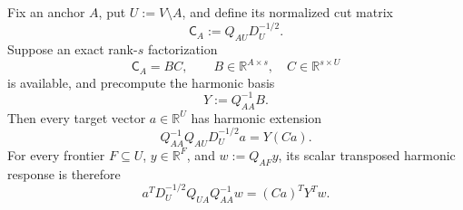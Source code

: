 \begin{theorem}
\label{thm:low-cut-rank-harmonic-bank}
Fix an anchor $A$, put $U:=V\setminus A$, and define its normalized cut
matrix
\begin{equation}
 \mathsf C_A:=Q_{AU}D_U^{-1/2}.
 \label{eq:normalized-anchor-cut}
\end{equation}
Suppose an exact rank-$s$ factorization
\begin{equation}
 \mathsf C_A=BC,
 \qquad
 B\in\mathbb R^{A\times s},
 \quad
 C\in\mathbb R^{s\times U}
 \label{eq:cut-rank-factorization}
\end{equation}
is available, and precompute the harmonic basis
\begin{equation}
 Y:=Q_{AA}^{-1}B.
 \label{eq:cut-rank-harmonic-basis}
\end{equation}
Then every target vector $a\in\mathbb R^U$ has harmonic extension
\begin{equation}
 Q_{AA}^{-1}Q_{AU}D_U^{-1/2}a=Y(Ca).
 \label{eq:cut-rank-target-extension}
\end{equation}
For every frontier $F\subseteq U$, $y\in\mathbb R^F$, and
$w:=Q_{AF}y$, its scalar transposed harmonic response is therefore
\begin{equation}
 a^TD_U^{-1/2}Q_{UA}Q_{AA}^{-1}w
 =(Ca)^TY^Tw.
 \label{eq:cut-rank-scalar-response}
\end{equation}


\end{theorem}
